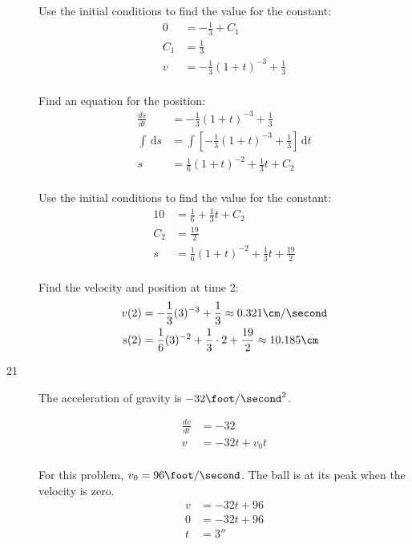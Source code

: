 \documentclass{exam}
\begin{document}
\begin{description}
Use the initial conditions to find the value for the constant:
\begin{align*}
  0 &= -\frac{1}{3} + C_1 \\
  C_1 &= \frac{1}{3} \\
  v &= -\frac{1}{3} (1 + t)^{-3} + \frac{1}{3} \\
\end{align*}

Find an equation for the position:
\begin{align*}
  \frac{ds}{dt} &= -\frac{1}{3} (1 + t)^{-3} + \frac{1}{3} \\
  \int \, \mathrm{d}s &= \int \left[ -\frac{1}{3} (1 + t)^{-3} + \frac{1}{3} \right] \, \mathrm{d}t \\
  s &= \frac{1}{6} (1 + t)^{-2} + \frac{1}{3} t + C_2 \\
\end{align*}

Use the initial conditions to find the value for the constant:
\begin{align*}
  10 &= \frac{1}{6} + \frac{1}{3} t + C_2 \\
  C_2 &= \frac{19}{2} \\
  s &= \frac{1}{6} (1 + t)^{-2} + \frac{1}{3} t + \frac{19}{2} \\
\end{align*}

Find the velocity and position at time 2:
\begin{align*}
  v(2) &= -\frac{1}{3} (3)^{-3} + \frac{1}{3} \approx 0.321  \cm / \second \\
  s(2) &= \frac{1}{6} (3)^{-2} + \frac{1}{3} \cdot 2 + \frac{19}{2} \approx 10.185  \cm \\
\end{align*}

\pagebreak

\item[21]
The acceleration of gravity is $-32 \foot / \second^2$.

\begin{align*}
  \frac{dv}{dt} &= -32 \\
  v &= -32t + v_0t \\
\end{align*}

For this problem, $v_0 = 96 \foot / \second$.  The ball is at its peak when the velocity is zero.
\begin{align*}
  v &= -32t + 96 \\
  0 &= -32t + 96 \\
  t &= 3 \second \\
\end{align*}


\end{description}
\end{document}
